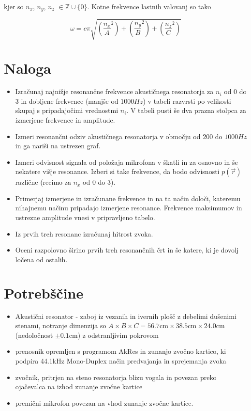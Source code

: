 \documentclass[12pt]{report}
\begin{document}
kjer so $n_x$, $n_y$, $n_z$ $\in \mathbb{Z} \cup \{0\}$. Kotne frekvence lastnih valovanj so tako

\begin{equation}\label{eq:om}
  \omega = c \pi \sqrt{\left(\frac{n_x}{A}^2\right) + \left(\frac{n_y}{B}^2\right) + \left(\frac{n_z}{C}^2\right)}
\end{equation}


\chapter*{Naloga}

\begin{itemize}
  \item Izračunaj najnižje resonančne frekvence akustičnega resonatorja za $n_i$ od 0 do 3 in dobljene frekvence (manjše od $1000Hz$) v tabeli razvrsti po velikosti skupaj s pripadajočimi vrednostmi $n_i$. V tabeli pusti še dva prazna stolpca za izmerjene frekvence in amplitude. 
  \item Izmeri resonančni odziv akustičnega resonatorja v območju od $200$ do $1000Hz$ in ga nariši na ustrezen graf.
  \item Izmeri odvisnost signala od položaja mikrofona v škatli in za osnovno in še nekatere višje resonance. Izberi si take frekvence, da bodo odvisnosti $p(\vec{r})$ različne (recimo za $n_x$ od 0 do 3). 
  \item Primerjaj izmerjene in izračunane frekvence in na ta način določi, kateremu nihajnemu načinu pripadajo izmerjene resonance. Frekvence maksimumov in ustrezne amplitude vnesi v pripravljeno tabelo. 
  \item Iz prvih treh resonanc izračunaj hitrost zvoka. 
  \item Oceni razpolovno širino prvih treh resonančnih črt in še katere, ki je dovolj ločena od ostalih. 
\end{itemize}


\begingroup
\let\clearpage\relax

\chapter*{Potrebščine}
\begin{itemize}
  \item Akustični resonator - zaboj iz vezanih in ivernih plošč z debelimi dušenimi stenami, notranje dimenzija so $A \times B \times C = 56.7\text{cm}\times 38.5\text{cm} \times 24.0 \text{cm}$ (nedoločnost $\pm 0.1$cm) z odstranljivim pokrovom
  \item prenosnik opremljen s programom AkRes in zunanjo zvočno kartico, ki podpira 44.1kHz Mono-Duplex način predvajanja in sprejemanja zvoka
  \item zvočnik, pritrjen na steno resonatorja blizu vogala in povezan preko ojačevalca na izhod zunanje zvočne kartice 
  \item premični mikrofon povezan na vhod zunanje zvočne kartice. 
\end{itemize}
\end{document}

